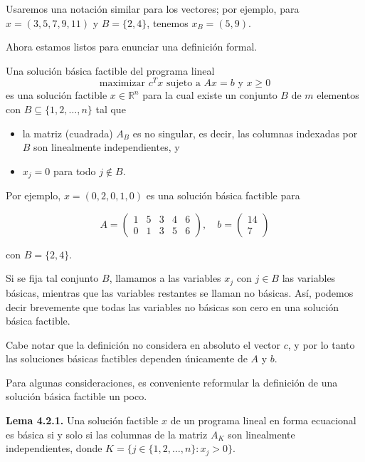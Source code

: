 \documentclass{article}
\begin{document}
Usaremos una notación similar para los vectores; por ejemplo, para \( x = (3, 5, 7, 9, 11) \) y \( B = \{2, 4\} \), tenemos \( x_B = (5, 9) \).

Ahora estamos listos para enunciar una definición formal.

\begin{tcolorbox}[colback=white, colframe=black, title=Definición de Solución Básica Factible]
Una solución básica factible del programa lineal
\[
\text{maximizar } c^T x \text{ sujeto a } Ax = b \text{ y } x \geq 0
\]
es una solución factible \( x \in \mathbb{R}^n \) para la cual existe un conjunto \( B \) de \( m \) elementos con \( B \subseteq \{1, 2, \ldots, n\} \) tal que
\begin{itemize}
    \item la matriz (cuadrada) \( A_B \) es no singular, es decir, las columnas indexadas por \( B \) son linealmente independientes, y
    \item \( x_j = 0 \) para todo \( j \notin B \).
\end{itemize}
\end{tcolorbox}

Por ejemplo, \( x = (0, 2, 0, 1, 0) \) es una solución básica factible para

\[
A = \begin{pmatrix}
1 & 5 & 3 & 4 & 6 \\
0 & 1 & 3 & 5 & 6
\end{pmatrix},
\quad b = \begin{pmatrix}
14 \\
7
\end{pmatrix}
\]

con \( B = \{2, 4\} \).

Si se fija tal conjunto \( B \), llamamos a las variables \( x_j \) con \( j \in B \) las variables básicas, mientras que las variables restantes se llaman no básicas. Así, podemos decir brevemente que todas las variables no básicas son cero en una solución básica factible.

Cabe notar que la definición no considera en absoluto el vector \( c \), y por lo tanto las soluciones básicas factibles dependen únicamente de \( A \) y \( b \).

Para algunas consideraciones, es conveniente reformular la definición de una solución básica factible un poco.

\textbf{Lema 4.2.1.} Una solución factible \( x \) de un programa lineal en forma ecuacional es básica si y solo si las columnas de la matriz \( A_K \) son linealmente independientes, donde \( K = \{j \in \{1, 2, \ldots, n\} : x_j > 0\} \).
\end{document}
